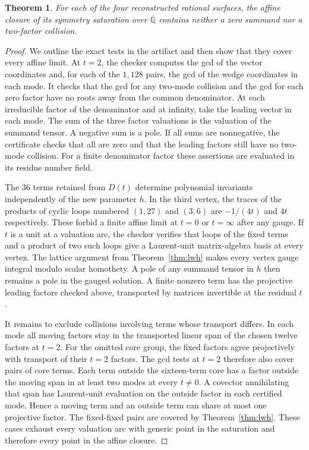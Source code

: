 \documentclass[11pt,reqno]{amsart}
\newcommand{\Q}{\mathbb Q}
\newtheorem{theorem}{Theorem}[section]
\begin{document}
\begin{theorem}\label{thm:surfaces}
For each of the four reconstructed rational surfaces, the affine closure of its symmetry saturation over \(\overline{\Q}\) contains neither a zero summand nor a two-factor collision.
\end{theorem}
\begin{proof}
We outline the exact tests in the artifact and then show that they cover every affine limit. At \(t=2\), the checker computes the gcd of the vector coordinates and, for each of the \(1,128\) pairs, the gcd of the wedge coordinates in each mode. It checks that the gcd for any two-mode collision and the gcd for each zero factor have no roots away from the common denominator. At each irreducible factor of the denominator and at infinity, take the leading vector in each mode. The sum of the three factor valuations is the valuation of the summand tensor. A negative sum is a pole. If all sums are nonnegative, the certificate checks that all are zero and that the leading factors still have no two-mode collision. For a finite denominator factor these assertions are evaluated in its residue number field.

The \(36\) terms retained from \(D(t)\) determine polynomial invariants independently of the new parameter \(h\). In the third vertex, the traces of the products of cyclic loops numbered \((1,27)\) and \((3,6)\) are \(-1/(4t)\) and \(4t\) respectively. These forbid a finite affine limit at \(t=0\) or \(t=\infty\) after any gauge. If \(t\) is a unit at a valuation arc, the checker verifies that loops of the fixed terms and a product of two such loops give a Laurent-unit matrix-algebra basis at every vertex. The lattice argument from Theorem~\ref{thm:lwh} makes every vertex gauge integral modulo scalar homothety. A pole of any summand tensor in \(h\) then remains a pole in the gauged solution. A finite nonzero term has the projective leading factors checked above, transported by matrices invertible at the residual \(t\).

It remains to exclude collisions involving terms whose transport differs. In each mode all moving factors stay in the transported linear span of the chosen twelve factors at \(t=2\). For the omitted core group, the fixed factors agree projectively with transport of their \(t=2\) factors. The gcd tests at \(t=2\) therefore also cover pairs of core terms. Each term outside the sixteen-term core has a factor outside the moving span in at least two modes at every \(t\ne0\). A covector annihilating that span has Laurent-unit evaluation on the outside factor in each certified mode. Hence a moving term and an outside term can share at most one projective factor. The fixed-fixed pairs are covered by Theorem~\ref{thm:lwh}. These cases exhaust every valuation arc with generic point in the saturation and therefore every point in the affine closure.
\end{proof}
\end{document}
